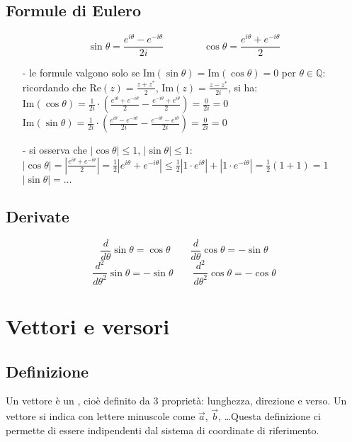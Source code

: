 \documentclass[a4paper]{article}
\newcommand\Real{\text{Re}}
\newcommand\Img{\text{Im}}
\begin{document}
\subsection{Formule di Eulero}
\[\sin \theta = \frac{e^{i\theta}-e^{-i\theta}}{2i} \qquad \qquad \cos \theta = \frac{e^{i\theta}+e^{-i\theta}}{2}\]
\begin{itemize}[topsep=3pt, itemsep=0pt]
	\item[-] le formule valgono solo se \(\Img (\sin \theta) = \Img (\cos \theta) = 0\) per \(\theta \in \mathbb{Q}\): \\
	ricordando che \(\displaystyle \Real (z) = \frac{z + z^*}{2}\), \(\displaystyle \Img (z) = \frac{z - z^*}{2i}\), si ha: \\
	\(\displaystyle \Img (\cos \theta) = \frac{1}{2i} \cdot \left(\frac{e^{i\theta}+e^{-i\theta}}{2} - \frac{e^{-i\theta}+e^{i\theta}}{2}\right) = \frac{0}{2i} = 0\) \\
	\(\displaystyle \Img (\sin \theta) = \frac{1}{2i} \cdot \left(\frac{e^{i\theta}-e^{-i\theta}}{2i} - \frac{e^{-i\theta}-e^{i\theta}}{2i}\right) = \frac{0}{2i} = 0\)
	\item[-] si osserva che \(\left|\cos \theta\right| \leq 1\), \(\left|\sin \theta\right| \leq 1\): \\
	\(\displaystyle \left|\cos \theta\right| = \left|\frac{e^{i\theta}+e^{-i\theta}}{2}\right| = \frac{1}{2}\left|e^{i\theta} + e^{-i\theta}\right| \leq \frac{1}{2}\left|1 \cdot e^{i\theta}\right| + \left|1 \cdot e^{-i\theta}\right|= \frac{1}{2} (1+1) = 1\) \\
	\(\displaystyle \left|\sin \theta\right| = \dots\)
\end{itemize}

\subsection{Derivate}
\[\frac{d}{d\theta} \sin \theta = \cos \theta \qquad \frac{d}{d\theta} \cos \theta = -\sin \theta\]
\[\frac{d^2}{d\theta^2} \sin \theta = -\sin \theta \qquad \frac{d^2}{d\theta^2} \cos \theta = -\cos \theta\]

\newpage


\section{Vettori e versori}
\subsection{Definizione}
Un vettore è un , cioè definito da 3 proprietà: lunghezza, direzione e verso. Un vettore si indica con
lettere minuscole come \(\vec{a}\), \(\vec{b}\), \dots Questa definizione ci permette di essere indipendenti dal sistema di 
coordinate di riferimento.
\end{document}
